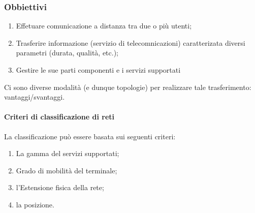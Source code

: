 \subsubsection{Obbiettivi}
\label{sec:obbiettivireti}
\begin{enumerate}
\item Effetuare comunicazione a distanza tra due o più utenti;
\item Trasferire informazione (servizio di telecomnicazioni) caratterizata diversi
  parametri (durata, qualità, etc.);
\item Gestire le sue parti componenti e i servizi supportati
\end{enumerate}
Ci sono diverse modalità (e dunque topologie) per realizzare tale trasferimento:
vantaggi/svantaggi.
\clearpage
\paragraph{Criteri di classificazione di reti}

La classificazione può essere basata sui seguenti criteri:
\begin{multicols}{2}
  \begin{enumerate}
  \item La gamma del servizi supportati;
  \item Grado di mobilità del terminale;
  \item l'Estensione fisica della rete;
  \item la posizione.
  \end{enumerate}
\end{multicols}

